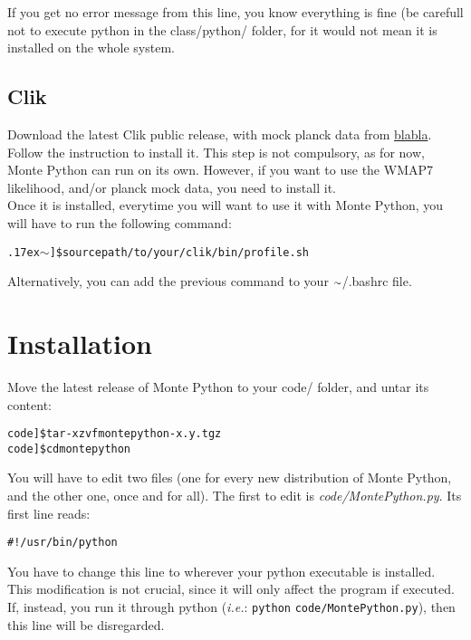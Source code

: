 \documentclass[10pt]{article}
\newcommand{\tild}{\raise.17ex\hbox{$\scriptstyle\mathtt{\sim}$}}
\begin{document}
  If you get no error message from this line, you know everything is fine (be
  carefull not to execute python in the class/python/ folder, for it would not
  mean it is installed on the whole system.

  \subsection{Clik}

  Download the latest Clik public release, with mock planck data from
  \url{blabla}. Follow the instruction to install it. This step is not
  compulsory, as for now, Monte Python can run on its own. However, if you want
  to use the WMAP7 likelihood, and/or planck mock data, you need to install it.\\

  Once it is installed, everytime you will want to use it with Monte Python,
  you will have to run the following command:

  \begin{alltt}
    \tild]\$ source path/to/your/clik/bin/profile.sh
  \end{alltt}
  
  Alternatively, you can add the previous command to your $\tild$/.bashrc file.


\newpage
\section{Installation}

  Move the latest release of Monte Python to your code/ folder, and untar its
  content:

  \begin{alltt} 
    code]\$ tar -xzvf montepython-x.y.tgz 
    code]\$ cd montepython
  \end{alltt}

 You will have to edit two files (one for every new distribution of Monte
 Python, and the other one, once and for all). The first to edit is
 \emph{code/MontePython.py}. Its first line reads:

 \begin{alltt}
    #!/usr/bin/python
 \end{alltt}

 You have to change this line to wherever your python executable is installed.
 This modification is not crucial, since it will only affect the program if
 executed. If, instead, you run it through python (\emph{i.e.}: \verb?python?
 \verb?code/MontePython.py?), then this line will be disregarded.
\end{document}
